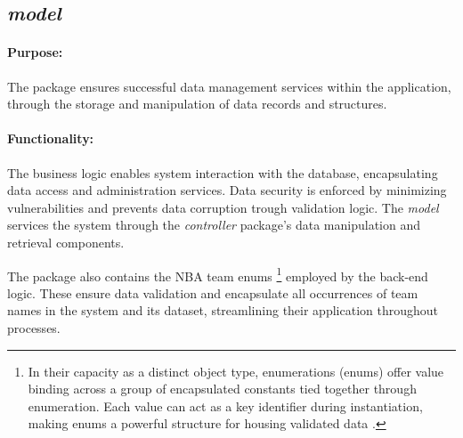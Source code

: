 \documentclass{thesis-ekf}
\theoremstyle{definition}
\theoremstyle{remark}
\begin{document}
\subsection{\emph{model}}
\paragraph{Purpose:}
The package ensures successful data management services within the application, through the storage and manipulation of data records and structures. 
\paragraph{Functionality:}
The business logic enables system interaction with the database, encapsulating data access and administration services. Data security is enforced by minimizing vulnerabilities and prevents data corruption trough validation logic. The \emph{model} services the system through the \emph{controller} package's data manipulation and retrieval components.

The package also contains the NBA team enums \footnote{In their capacity as a distinct object type, enumerations (enums) offer value binding across a group of encapsulated constants tied together through enumeration. Each value can act as a key identifier during instantiation, making enums a powerful structure for housing validated data \cite{enum}.} employed by the back-end logic. These ensure data validation and encapsulate all occurrences of team names in the system and its dataset, streamlining their application throughout processes.
\end{document}
